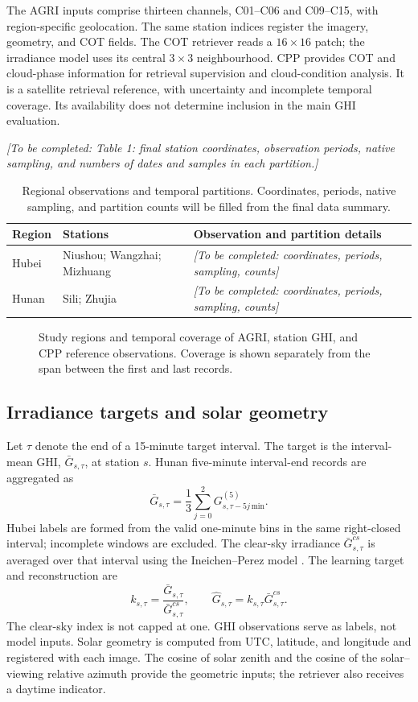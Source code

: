 \documentclass[11pt]{article}
\newcommand{\pending}[1]{\textit{[To be completed: #1]}}
\newcommand{\figslot}[3]{%
\begin{figure}[!htbp]\centering
\fbox{\begin{minipage}[c][32mm][c]{0.92\linewidth}\centering #1\end{minipage}}
\caption{#2}\label{#3}\end{figure}}
\begin{document}
The AGRI inputs comprise thirteen channels, C01--C06 and C09--C15, with region-specific geolocation. The same station indices register the imagery, geometry, and COT fields. The COT retriever reads a $16\times16$ patch; the irradiance model uses its central $3\times3$ neighbourhood. CPP provides COT and cloud-phase information for retrieval supervision and cloud-condition analysis. It is a satellite retrieval reference, with uncertainty and incomplete temporal coverage. Its availability does not determine inclusion in the main GHI evaluation.

\pending{Table 1: final station coordinates, observation periods, native sampling, and numbers of dates and samples in each partition.}
\begin{table}[!htbp]\centering\small
\caption{Regional observations and temporal partitions. Coordinates, periods, native sampling, and partition counts will be filled from the final data summary.}\label{tab:data}
\begin{tabularx}{\linewidth}{lXX}\toprule
Region & Stations & Observation and partition details\\\midrule
Hubei & Niushou; Wangzhai; Mizhuang & \pending{coordinates, periods, sampling, counts}\\
Hunan & Sili; Zhujia & \pending{coordinates, periods, sampling, counts}\\\bottomrule
\end{tabularx}\end{table}
\figslot{Station map and observation coverage}{Study regions and temporal coverage of AGRI, station GHI, and CPP reference observations. Coverage is shown separately from the span between the first and last records.}{fig:regions}

\subsection{Irradiance targets and solar geometry}
Let $\tau$ denote the end of a 15-minute target interval. The target is the interval-mean GHI, $\bar G_{s,\tau}$, at station $s$. Hunan five-minute interval-end records are aggregated as
\begin{equation}
\bar G_{s,\tau}=\frac13\sum_{j=0}^{2}G^{(5)}_{s,\tau-5j\,\mathrm{min}}.
\label{eq:interval}
\end{equation}
Hubei labels are formed from the valid one-minute bins in the same right-closed interval; incomplete windows are excluded. The clear-sky irradiance $\bar G^{cs}_{s,\tau}$ is averaged over that interval using the Ineichen--Perez model \cite{ineichen,pvlibclear}. The learning target and reconstruction are
\begin{equation}
k_{s,\tau}=\frac{\bar G_{s,\tau}}{\bar G^{cs}_{s,\tau}},\qquad
\widehat G_{s,\tau}=\widehat k_{s,\tau}\bar G^{cs}_{s,\tau}.
\label{eq:kt}
\end{equation}
The clear-sky index is not capped at one. GHI observations serve as labels, not model inputs. Solar geometry is computed from UTC, latitude, and longitude and registered with each image. The cosine of solar zenith and the cosine of the solar--viewing relative azimuth provide the geometric inputs; the retriever also receives a daytime indicator.
\end{document}
